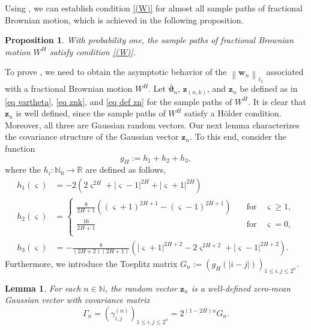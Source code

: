 \documentclass[12pt,reqno]{article}
\newcommand{\norm}[1]{\left\lVert {#1}\right\rVert}
\numberwithin{equation}{section}
\newtheorem{proposition}[theorem]{Proposition}
\newtheorem{lemma}[theorem]{Lemma}
\theoremstyle{definition}
\newcommand{\bR}{\mathbb{R}}
\newcommand{\bN}{\mathbb{N}}
\begin{document}
Using , we can establish condition \eqref{(W)} for almost all sample paths of fractional Brownian motion, which is achieved in the following proposition.

	
\begin{proposition}\label{lemma fbm decaying}
	With probability one, the sample paths of fractional Brownian motion $W^H$ satisfy condition \eqref{(W)}.
\end{proposition}

	
To prove , we need to obtain the asymptotic behavior of the $\norm{\bm w_n}_{\ell_2}$ associated with a fractional Brownian motion $W^H$. Let $\bar{\bm \vartheta}_{n}$, $\bm z_{(n,k)}$, and $\bm z_n$ be defined  as in \eqref{eq vartheta}, \eqref{eq znk}, and  \eqref{eq def zn} for the sample paths of $W^H$. It is clear that $\bm z_n$   is well defined, since the sample paths of $W^H$ satisfy a H\"older condition. Moreover, all three are  Gaussian random vectors. Our next lemma characterizes the covariance structure of the Gaussian vector $\bm z_n$.  To this end, consider the function $$g_H := h_1 + h_2 + h_3,$$
 where the $h_{i}: \bN_0 \rightarrow \bR$ are defined as follows,
\begin{equation}\label{eq delta}
\begin{split}
h_1({\varsigma}) &= -2\left(2{\varsigma}^{2H} + |{\varsigma}-1|^{2H}+|{\varsigma}+1|^{2H}\right) \\
h_2({\varsigma}) &= \begin{cases}
\frac{8}{2H+1}\left(({\varsigma}+1)^{2H+1} -({\varsigma}-1)^{2H+1}\right)
&\quad \text{for} \quad {\varsigma} \ge 1,\\
\frac{16}{2H+1}
&\quad \text{for} \quad {\varsigma} = 0,\\
\end{cases}\\ h_3({\varsigma})&=-\frac{8}{(2H+2)(2H+1)}\left(|{\varsigma}+1|^{2H+2}-2{\varsigma}^{2H+2}+|{\varsigma}-1|^{2H+2}\right).
\end{split}
\end{equation}
Furthermore, we introduce the  Toeplitz matrix $G_n := (g_H(|i-j|))_{1 \le i,j \le 2^n}$.

\begin{lemma}\label{lemma gamma ij}
	For each $n \in \bN$, the random vector $\bm z_{n}$ is a well-defined zero-mean Gaussian vector with covariance matrix 
	\begin{equation*}
	\Gamma_n = (\gamma^{(n)}_{i,j})_{1 \le i,j \le 2^n} =  2^{(1-2H)n}G_n.
	\end{equation*}
\end{lemma}
\end{document}
